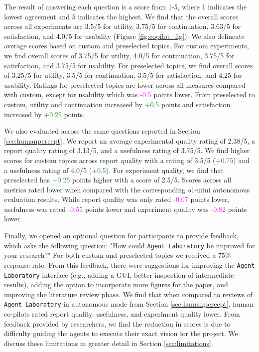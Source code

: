 \documentclass[11pt, a4paper]{gdm_format}
\begin{document}
The result of answering each question is a score from 1-5, where 1 indicates the lowest agreement and 5 indicates the highest. We find that the overall scores across all experiments are 3.5/5 for utility, 3.75/5 for continuation, 3.63/5 for satisfaction, and 4.0/5 for usability (Figure \ref{fig:copilot_fig}).
We also delineate average scores based on custom and preselected topics. For custom experiments, we find overall scores of 3.75/5 for utility, 4.0/5 for continuation, 3.75/5 for satisfaction, and 3.75/5 for usability. For preselected topics, we find overall scores of 3.25/5 for utility, 3.5/5 for continuation, 3.5/5 for satisfaction, and 4.25 for usability. Ratings for preselected topics are lower across all measures compared with custom, except for usability which was \textcolor{Magenta}{-0.5} points lower. From preselected to custom, utility and continuation increased by \textcolor{ForestGreen}{+0.5} points and satisfaction increased by \textcolor{ForestGreen}{+0.25} points. 

We also evaluated across the same questions reported in Section \ref{sec:humanpercept}. We report an average experimental quality rating of 2.38/5, a report quality rating of 3.13/5, and a usefulness rating of 3.75/5. We find higher scores for custom topics across report quality with a rating of 3.5/5 (\textcolor{ForestGreen}{+0.75}) and a usefulness rating of 4.0/5 (\textcolor{ForestGreen}{+0.5}). For experiment quality, we find that preselected has \textcolor{ForestGreen}{+0.25} points higher with a score of 2.5/5. Scores across all metrics rated lower when compared with the corresponding o1-mini autonomous evaluation results. While report quality was only rated \textcolor{Magenta}{-0.07} points lower, usefulness was rated \textcolor{Magenta}{-0.55} points lower and experiment quality was \textcolor{Magenta}{-0.82} points lower.

Finally, we opened an optional question for participants to provide feedback, which asks the following question: "How could \texttt{Agent Laboratory} be improved for your research?" For both custom and preselected topics we received a 75\% response rate. From this feedback, there were suggestions for improving the \texttt{Agent Laboratory} interface (e.g., adding a GUI, better inspection of intermediate results), adding the option to incorporate more figures for the paper, and improving the literature review phase. We find that when compared to reviews of \texttt{Agent Laboratory} in autonomous mode from Section \ref{sec:humanpercept}, human co-pilots rated report quality, usefulness, and experiment quality lower. From feedback provided by researchers, we find the reduction in scores is due to difficulty guiding the agents to execute their exact vision for the project. We discuss these limitations in greater detail in Section \ref{sec:limitations}.
\end{document}
